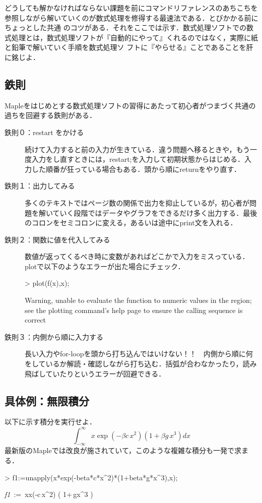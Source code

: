 どうしても解かなければならない課題を前にコマンドリファレンスのあちこちを参照しながら解いていくのが数式処理を修得する最速法である．とびかかる前にちょっとした共通
のコツがある．それをここでは示す．数式処理ソフトでの数式処理とは，数式処理ソフトが『自動的にやって』くれるのではなく，実際に紙と鉛筆で解いていく手順を数式処理ソ
フトに『やらせる』ことであることを肝に銘じよ．

\subsection{鉄則}
Mapleをはじめとする数式処理ソフトの習得にあたって初心者がつまづく共通の過ちを回避する鉄則がある．
\begin{description}
\item[鉄則０：restart をかける]
続けて入力すると前の入力が生きている．違う問題へ移るときや，もう一度入力をし直すときには，restart;を入力して初期状態からはじめる．入力した順番が狂っている場合もある．頭から順にreturnをやり直す．
\item[鉄則１：出力してみる]
多くのテキストではページ数の関係で出力を抑止しているが，初心者が問題を解いていく段階ではデータやグラフをできるだけ多く出力する．最後のコロンをセミコロンに変える，あるいは途中にprint文を入れる．
\item[鉄則２：関数に値を代入してみる]
数値が返ってくるべき時に変数があればどこかで入力をミスっている．plotで以下のようなエラーが出た場合にチェック．
\begin{MapleInput}
> plot(f(x),x);
\end{MapleInput}
\begin{MapleError}
Warning, unable to evaluate the function to numeric values in the region; see
the plotting command's help page to ensure the calling sequence is correct
\end{MapleError}
\item[鉄則３：内側から順に入力する]
長い入力やfor-loopを頭から打ち込んではいけない！！　内側から順に何をしているか解読・確認しながら打ち込む．括弧が合わなかったり，読み飛ばしていたりというエラーが回避できる．
\end{description}

\subsection{具体例：無限積分}
以下に示す積分を実行せよ．
\begin{equation*}
\int _{-\infty }^{\infty }x \exp(-\beta c\,{x}^{2}) \left( 1+\beta g\,{x}^{3} \right) {dx}
\end{equation*}
最新版のMapleでは改良が施されていて，このような複雑な積分も一発で求まる．
\begin{MapleInput}
> f1:=unapply(x*exp(-beta*c*x^2)*(1+beta*g*x^3),x);
\end{MapleInput}
\begin{MapleOutput}
{\it f1}\, := \,x\mapsto x\exp(-\beta c\,{x}^{2}) \left( 1+\beta\,g{x}^{3} \right) 
\end{MapleOutput}

